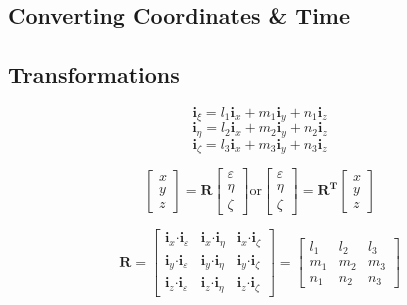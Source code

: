 %
\begin{bibunit}
\chapter{Converting Coordinates \& Time}
\section{Transformations}

\[\mathbf{i}_{\xi}=l_{1}\mathbf{i}_{x}+m_{1}\mathbf{i}_{y}+n_{1}\mathbf{i}_{z}\]
\[\mathbf{i}_{\eta}=l_{2}\mathbf{i}_{x}+m_{2}\mathbf{i}_{y}+n_{2}\mathbf{i}_{z}\]
\[\mathbf{i}_{\zeta}=l_{3}\mathbf{i}_{x}+m_{3}\mathbf{i}_{y}+n_{3}\mathbf{i}_{z}\]

\[ \left[ \begin{array}{c} x \\ y \\ z  \end{array} \right] = \mathbf{R}\left[ \begin{array}{c} \varepsilon \\ \eta \\ \zeta  \end{array} \right] \mbox{or}
\left[ \begin{array}{c} \varepsilon \\ \eta \\ \zeta  \end{array} \right] = \mathbf{R^{T}}\left[ \begin{array}{c} x \\ y \\ z  \end{array} \right] \]

\[\mathbf{R}=\left[ \begin{array}{ccc}
\mathbf{i}_{x}\mathbf{\cdot}\mathbf{i}_{\varepsilon} & \mathbf{i}_{x}\mathbf{\cdot}\mathbf{i}_{\eta} & \mathbf{i}_{x}\mathbf{\cdot}\mathbf{i}_{\zeta} \\
\mathbf{i}_{y}\mathbf{\cdot}\mathbf{i}_{\varepsilon} & \mathbf{i}_{y}\mathbf{\cdot}\mathbf{i}_{\eta} & \mathbf{i}_{y}\mathbf{\cdot}\mathbf{i}_{\zeta} \\
\mathbf{i}_{z}\mathbf{\cdot}\mathbf{i}_{\varepsilon} & \mathbf{i}_{z}\mathbf{\cdot}\mathbf{i}_{\eta} & \mathbf{i}_{z}\mathbf{\cdot}\mathbf{i}_{\zeta}
\end{array} \right] = \left[ \begin{array}{ccc}
l_{1} & l_{2} & l_{3} \\
m_{1} & m_{2} & m_{3} \\
n_{1} & n_{2} & n_{3}
\end{array} \right] \]


\end{bibunit}
